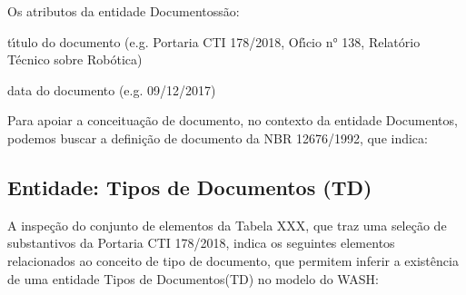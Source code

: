 \documentclass[
12pt,		%
openright,	%
twoside,  %
a4paper,			%
chapter=TITLE,		%
english,			%
french,				%
spanish,			%
brazil				%
]{USPSC-classe/USPSC}
\begin{document}
Os atributos da entidade \textquotedbl Documentos\textquotedbl  s\~ao:





\begin{alineas}
\item t\'{\i}tulo do documento (e.g. \textquotedbl Portaria CTI 178/2018\textquotedbl , \textquotedbl Of\'{\i}cio n° 138\textquotedbl , \textquotedbl Relat\'orio T\'ecnico sobre Rob\'otica\textquotedbl )
\item data do documento (e.g. 09/12/2017)
\end{alineas}

Para apoiar a conceitua\c{c}\~ao de documento, no contexto da entidade \textquotedbl Documentos\textquotedbl , podemos buscar a defini\c{c}\~ao de documento da NBR 12676/1992, que indica:





\noindent\begin{center}\mbox{\centering{}}\end{center}


\subsection[Entidade: Tipos de Documentos (TD)]{Entidade: Tipos de Documentos (TD)}\label{Entidade: Tipos de Documentos (TD)}
A inspe\c{c}\~ao do conjunto de elementos da Tabela XXX, que traz uma sele\c{c}\~ao de substantivos da Portaria CTI 178/2018, indica os seguintes elementos relacionados ao conceito de \textquotedbl tipo de documento\textquotedbl , que permitem inferir a exist\^encia de uma entidade \textquotedbl Tipos de Documentos\textquotedbl  (TD) no modelo do WASH:





\noindent\begin{center}\mbox{\centering{}}\end{center}
\end{document}

